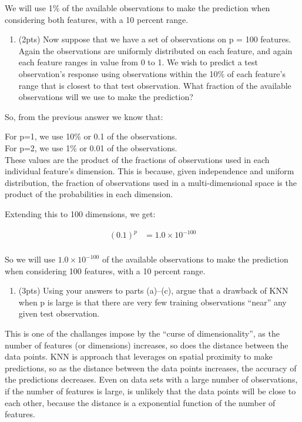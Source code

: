 \documentclass[11pt]{article}
\providecommand{\tightlist}{%
      \setlength{\itemsep}{0pt}\setlength{\parskip}{0pt}}
\begin{document}
We will use 1\% of the available observations to make the prediction
when considering both features, with a 10 percent range.

    \begin{enumerate}
\def\labelenumi{(\alph{enumi})}
\setcounter{enumi}{2}
\tightlist
\item
  (2pts) Now suppose that we have a set of observations on p = 100
  features. Again the observations are uniformly distributed on each
  feature, and again each feature ranges in value from 0 to 1. We wish
  to predict a test observation's response using observations within the
  10\% of each feature's range that is closest to that test observation.
  What fraction of the available observations will we use to make the
  prediction?
\end{enumerate}

    So, from the previous answer we know that:

For p=1, we use 10\% or 0.1 of the observations.\\
For p=2, we use 1\% or 0.01 of the observations.\\

These values are the product of the fractions of observations used in
each individual feature's dimension. This is because, given independence
and uniform distribution, the fraction of observations used in a
multi-dimensional space is the product of the probabilities in each
dimension.

Extending this to 100 dimensions, we get:

\[
\begin{align}
(0.1)^{p} &= 1.0 \times 10^{-100} \\
\end{align}
\]

So we will use \(1.0 \times 10^{-100}\) of the available observations to
make the prediction when considering 100 features, with a 10 percent
range.

    \begin{enumerate}
\def\labelenumi{(\alph{enumi})}
\setcounter{enumi}{3}
\tightlist
\item
  (3pts) Using your answers to parts (a)--(c), argue that a drawback of
  KNN when p is large is that there are very few training observations
  ``near'' any given test observation.
\end{enumerate}

    This is one of the challanges impose by the ``curse of dimensionality'',
as the number of features (or dimensions) increases, so does the
distance between the data points. KNN is approach that leverages on
spatial proximity to make predictions, so as the distance between the
data points increases, the accuracy of the predictions decreases. Even
on data sets with a large number of observations, if the number of
features is large, is unlikely that the data points will be close to
each other, because the distance is a exponential function of the number
of features.
\end{document}
